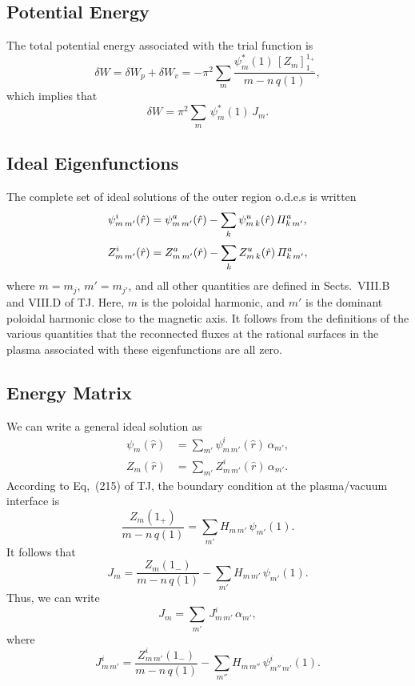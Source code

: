 \documentclass[12pt,prb,aps,notitlepage]{revtex4-1}
\begin{document}
\subsection{Potential Energy}
The total potential energy associated with the trial function is
\begin{equation}
\delta W = \delta W_p + \delta W_v = -\pi^2\sum_m \frac{\psi_m^\ast(1)\,[Z_m]_{1_{-}}^{1_{+}}}{m-n\,q(1)},
\end{equation}
which implies that
\begin{equation}
\delta W =\pi^2\sum_m\,\psi_m^\ast(1)\,J_m.
\end{equation}

\subsection{Ideal Eigenfunctions}
The complete set of ideal solutions of the outer region o.d.e.s is written
\begin{align}
\psi_{m\,m'}^i(\hat{r})&= \psi_{m\,m'}^a(\hat{r})-\sum_{k}\psi_{m\,k}^u(\hat{r})\,{\mit\Pi}_{k\,m'}^a,\\[0.5ex]
Z_{m\,m'}^i(\hat{r})&= Z_{m\,m'}^a(\hat{r})-\sum_{k}Z_{m\,k}^u(\hat{r})\,{\mit\Pi}_{k\,m'}^a,
\end{align}
where $m=m_j$, $m'=m_{j'}$, and all other quantities are defined in Sects.~VIII.B and VIII.D of TJ. 
Here, $m$ is the poloidal harmonic, and $m'$ is the dominant poloidal harmonic close to the magnetic axis. It follows
from the definitions of the various quantities that the reconnected fluxes at the rational surfaces in the plasma
associated with these eigenfunctions are all zero. 

\subsection{Energy Matrix}
We can write a general ideal solution as
\begin{align}
\psi_m(\hat{r}) &= \sum_{m'}\psi_{m\,m'}^i(\hat{r})\,\alpha_{m'},\\[0.5ex]
Z_m(\hat{r}) &= \sum_{m'}Z_{m\,m'}^i(\hat{r})\,\alpha_{m'}.
\end{align}
According to Eq,~(215) of TJ, the boundary condition at the plasma/vacuum interface is
\begin{equation}
\frac{Z_m(1_+)}{m-n\,q(1)} = \sum_{m'}H_{m\,m'}\,\psi_{m'}(1).
\end{equation}
It follows that
\begin{equation}
J_m = \frac{Z_m(1_-)}{m-n\,q(1)}-\sum_{m'} H_{m\,m'}\,\psi_{m'}(1).
\end{equation}
Thus, we can write 
\begin{equation}
J_m = \sum_{m'}\,J_{m\,m'}^i\,\alpha_{m'},
\end{equation}
where
\begin{equation}
J_{m\,m'}^i = \frac{Z_{m\,m'}^i(1_-)}{m-n\,q(1)}-\sum_{m''} H_{m\,m''}\,\psi_{m''\,m'}^i(1).
\end{equation}
\end{document}
